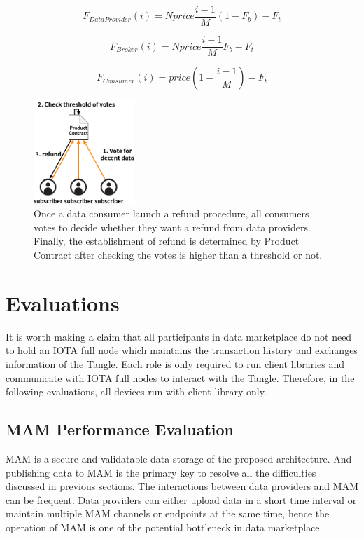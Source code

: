 \documentclass[conference]{IEEEtran}
\begin{document}
\begin{equation}
    F_{DataProvider}(i) = Nprice \frac{i-1}{M} (1-F_{b}) -F_{t}
\end{equation}

\begin{equation}
    F_{Broker}(i) = Nprice \frac{i-1}{M} F_{b} -F_{t}
\end{equation}

\begin{equation}
    F_{Consumer}(i) = price (1-\frac{i-1}{M}) -F_{t}
\end{equation}

\begin{figure}[h]
    \centering
    \includegraphics[width=1.5in]{refund}
    \caption{Once a data consumer launch a refund procedure, all consumers votes to decide whether they want a refund from data providers. Finally, the establishment of refund is determined by Product Contract after checking the votes is higher than a threshold or not.}
    \label{fig:refund}
\end{figure}


\section{Evaluations}
\label{section:evaluation}
It is worth making a claim that all participants in data marketplace do not need to hold an IOTA full node which maintains the transaction history and exchanges information of the Tangle. Each role is only required to run client libraries and communicate with IOTA full nodes to interact with the Tangle. Therefore, in the following evaluations, all devices run with client library only.

\subsection{MAM Performance Evaluation}
\label{section:mam_performance}
MAM is a secure and validatable data storage of the proposed architecture. And publishing data to MAM is the primary key to resolve all the difficulties discussed in previous sections. The interactions between data providers and MAM can be frequent. Data providers can either upload data in a short time interval or maintain multiple MAM channels or endpoints at the same time, hence the operation of MAM is one of the potential bottleneck in data marketplace.
\end{document}
